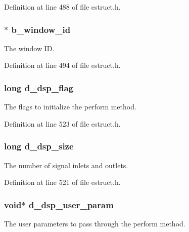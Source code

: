 Definition at line 488 of file estruct.\-h.

\hypertarget{struct__edspbox_a7033df943e798c68e3a6117785c2d79e}{
\subsubsection[{b\-\_\-window\-\_\-id}]{$\ast$ b\-\_\-window\-\_\-id}}\label{struct__edspbox_a7033df943e798c68e3a6117785c2d79e}
The window I\-D. 

Definition at line 494 of file estruct.\-h.

\hypertarget{struct__edspbox_af3409f354253e5753dbba6b22472972e}{
\subsubsection[{d\-\_\-dsp\-\_\-flag}]{\setlength{\rightskip}{0pt plus 5cm}long d\-\_\-dsp\-\_\-flag}}\label{struct__edspbox_af3409f354253e5753dbba6b22472972e}
The flags to initialize the perform method. 

Definition at line 523 of file estruct.\-h.

\hypertarget{struct__edspbox_a0bb016ebe02ce3d3a0965a19c1d8476d}{
\subsubsection[{d\-\_\-dsp\-\_\-size}]{\setlength{\rightskip}{0pt plus 5cm}long d\-\_\-dsp\-\_\-size}}\label{struct__edspbox_a0bb016ebe02ce3d3a0965a19c1d8476d}
The number of signal inlets and outlets. 

Definition at line 521 of file estruct.\-h.

\hypertarget{struct__edspbox_ab056760f93f95b4edc3a8dddd0b5b62f}{
\subsubsection[{d\-\_\-dsp\-\_\-user\-\_\-param}]{\setlength{\rightskip}{0pt plus 5cm}void$\ast$ d\-\_\-dsp\-\_\-user\-\_\-param}}\label{struct__edspbox_ab056760f93f95b4edc3a8dddd0b5b62f}
The user parameters to pass through the perform method. 

